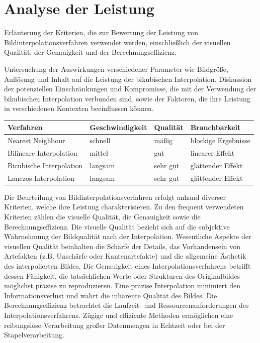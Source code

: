 \section{Analyse der Leistung}

    Erläuterung der Kriterien, die zur Bewertung der Leistung von Bildinterpolationsverfahren verwendet werden, einschließlich der visuellen Qualität, der Genauigkeit und der Berechnungseffizienz.

    Untersuchung der Auswirkungen verschiedener Parameter wie Bildgröße, Auflösung und Inhalt auf die Leistung der bikubischen Interpolation.
    Diskussion der potenziellen Einschränkungen und Kompromisse, die mit der Verwendung der bikubischen Interpolation verbunden sind, sowie der Faktoren, die ihre Leistung in verschiedenen Kontexten beeinflussen können.

    \begin{table}[h]
        \begin{tabular}{l|l|l|l}
            Verfahren & Geschwindigkeit & Qualität & Brauchbarkeit \\ \hline \hline
            Nearest Neighbour & schnell & mäßig & blockige Ergebnisse \\ \hline
            Bilineare Interpolation & mittel & gut & linearer Effekt \\ \hline
            Bicubische Interpolation & langsam & sehr gut & glättender Effekt \\ \hline
            Lanczos-Interpolation & langsam & sehr gut & glättender Effekt \\
        \end{tabular}
    \end{table}

Die Beurteilung von Bildinterpolationsverfahren erfolgt anhand diverser Kriterien, welche ihre Leistung charakterisieren.
Zu den frequent verwendeten Kriterien zählen die visuelle Qualität, die Genauigkeit sowie die Berechnungseffizienz.
Die visuelle Qualität bezieht sich auf die subjektive Wahrnehmung der Bildqualität nach der Interpolation.
Wesentliche Aspekte der visuellen Qualität beinhalten die Schärfe der Details, das Vorhandensein von Artefakten (z.B. Unschärfe oder Kantenartefakte) und die allgemeine Ästhetik des interpolierten Bildes.
Die Genauigkeit eines Interpolationsverfahrens betrifft dessen Fähigkeit, die tatsächlichen Werte oder Strukturen des Originalbildes möglichst präzise zu reproduzieren.
Eine präzise Interpolation minimiert den Informationsverlust und wahrt die inhärente Qualität des Bildes.
Die Berechnungseffizienz betrachtet die Laufzeit- und Ressourcenanforderungen des Interpolationsverfahrens.
Zügige und effiziente Methoden ermöglichen eine reibungslose Verarbeitung großer Datenmengen in Echtzeit oder bei der Stapelverarbeitung.

